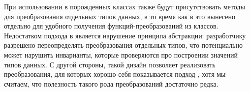 При использовании \visitors{} в порожденных классах также будут присутствовать методы для преобразования отдельных типов данных, в то время как в \GT{} это вынесено отдельно для удобного получения функций-преобразований из классов. Недостатком подхода в \visitors{} является нарушение принципа абстракции: разработчику разрешено переопределять преобразования отдельных типов, что потенциально может нарушить инварианты, которые проверяются про построении значений типов данных. С другой стороны, такой дизайн позволяет реализовать преобразования, для которых хорошо себя показывается подход \cite{SYB}, хотя мы считаем, что полезность такого рода преобразований достаточно редка.

